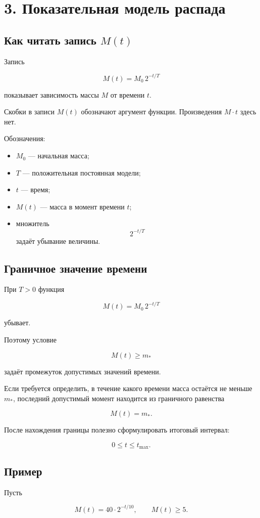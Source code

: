 \documentclass[a4paper,12pt]{article}
\newcommand{\sect}[1]{%
  \section*{\color{darkaccent}#1}%
}
\newcommand{\subsect}[1]{%
  \subsection*{\color{accent}#1}%
}
\begin{document}
\sect{3. Показательная модель распада}

\subsect{Как читать запись \texorpdfstring{$M(t)$}{M(t)}}

Запись

\[
M(t)=M_0\,2^{-t/T}
\]

показывает зависимость массы $M$ от времени $t$.

Скобки в записи $M(t)$ обозначают аргумент функции.
Произведения $M\cdot t$ здесь нет.

Обозначения:

\begin{itemize}

  \item $M_0$ --- начальная масса;

  \item $T$ --- положительная постоянная модели;

  \item $t$ --- время;

  \item $M(t)$ --- масса в момент времени $t$;

  \item множитель
  \[
  2^{-t/T}
  \]
  задаёт убывание величины.

\end{itemize}


\subsect{Граничное значение времени}

При $T>0$ функция

\[
M(t)=M_0\,2^{-t/T}
\]

убывает.

Поэтому условие

\[
M(t)\ge m_*
\]

задаёт промежуток допустимых значений времени.

Если требуется определить,
в течение какого времени масса остаётся не меньше $m_*$,
последний допустимый момент находится из граничного равенства

\[
M(t)=m_*.
\]

После нахождения границы полезно сформулировать итоговый интервал:

\[
0\le t\le t_{\max}.
\]


\subsect{Пример}

Пусть

\[
M(t)=40\cdot2^{-t/10},
\qquad
M(t)\ge5.
\]
\end{document}
